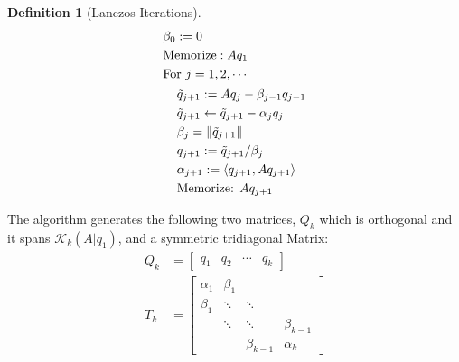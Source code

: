 \documentclass[]{article}
\theoremstyle{definition}
\newtheorem{definition}{Definition}      %
\begin{document}
\begin{definition}[Lanczos Iterations]
\begin{align}
\begin{aligned}
                        & \beta_0 := 0
                        \\
                        & \text{Memorize}: Aq_1
                        \\
                        & \text{For }j = 1, 2, \cdots
                        \\
                        &\hspace{1.1em}
                        \begin{aligned}
                            & \tilde{q}_{j + 1} := Aq_j - \beta_{j - 1} q_{j - 1}
                            \\
                            & \tilde{q}_{j + 1} \leftarrow \tilde{q}_{j + 1} - \alpha_jq_j
                            \\
                            & \beta_j = \Vert \tilde{q}_{j + 1}\Vert
                            \\
                            & q_{j + 1}:= \tilde{q}_{j + 1}/\beta_j
                            \\
                            & \alpha_{j + 1} := \left\langle q_{j + 1}, Aq_{j + 1} \right\rangle
                            \\
                            & \text{Memorize: }Aq_{j + 1}
                        \end{aligned}
                    \end{aligned}
                \end{align}
            \end{definition}
            The algorithm generates the following two matrices, $Q_k$ which is orthogonal and it spans $\mathcal K_k(A|q_1)$, and a symmetric tridiagonal Matrix: 
            \begin{align}
                Q_k &= \begin{bmatrix}
                    q_1 & q_2 & \cdots & q_k
                \end{bmatrix}
                \\
                T_k &= 
                \begin{bmatrix}
                    \alpha_1 & \beta_1 & & 
                    \\[0.8em]
                    \beta_1 & \ddots & \ddots & 
                    \\[0.8em]
                    &\ddots &\ddots & \beta_{k - 1}
                    \\[0.8em]
                    & & \beta_{k - 1} & \alpha_k
                \end{bmatrix}
            \end{align}
\end{document}

